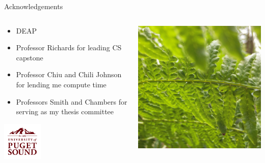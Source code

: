 \appendix

\begin{frame}{Acknowledgements}
\begin{columns}
\begin{column}{0.6\textwidth}
\begin{itemize}
\item DEAP \cite{Fortin2012DEAP:Easy}
\item Professor Richards for leading CS capstone
\item Professor Chiu and Chili Johnson for lending me compute time
\item Professors Smith and Chambers for serving as my thesis committee
\end{itemize}
	\vspace{-1ex}
	\begin{center}{
    \includegraphics[width= 0.3\textwidth]{img/UofPS_stacked_maroonRGB_PNG}}
    \end{center}

\end{column}
\begin{column}{0.4\textwidth}
\begin{center}
\includegraphics[width=\textwidth,trim={16cm 0 21cm 0},clip]{img/forest_fern}
\end{center}
\end{column}
\end{columns}

\end{frame}


